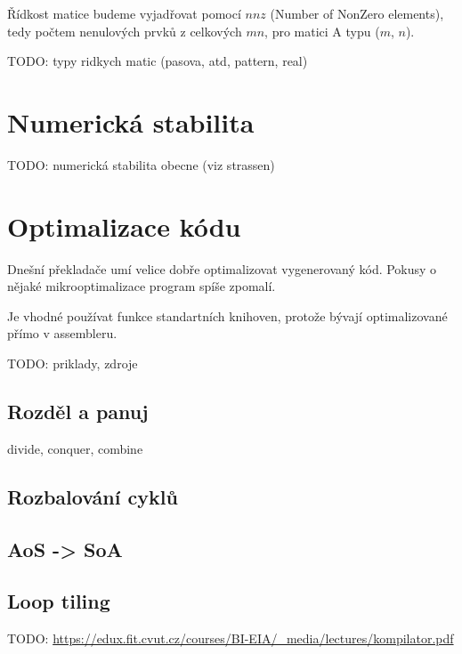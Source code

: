 Řídkost matice budeme vyjadřovat pomocí $nnz$ (Number of NonZero elements), tedy počtem nenulových prvků z celkových $mn$, pro matici A typu ($m$, $n$).

TODO: typy ridkych matic (pasova, atd, pattern, real)

\section{Numerická stabilita}

TODO: numerická stabilita obecne (viz strassen)

\section{Optimalizace kódu}

Dnešní překladače umí velice dobře optimalizovat vygenerovaný kód. Pokusy o nějaké mikrooptimalizace program spíše zpomalí.

Je vhodné používat funkce standartních knihoven, protože bývají optimalizované přímo v assembleru.

TODO: priklady, zdroje

\subsection{Rozděl a panuj}
divide, conquer, combine

\subsection{Rozbalování cyklů}

\subsection{AoS -> SoA}

\subsection{Loop tiling}

TODO: \url{https://edux.fit.cvut.cz/courses/BI-EIA/_media/lectures/kompilator.pdf}

